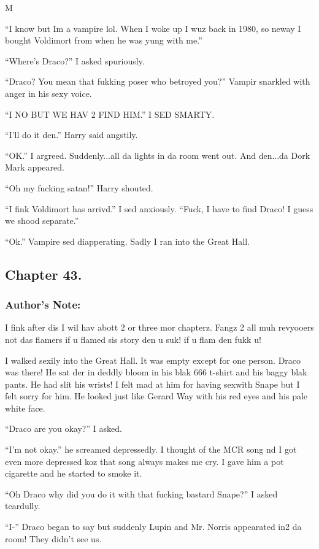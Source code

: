 M\documentclass{article}
\begin{document}
“I know but Im a vampire lol. When I woke up I wuz back in 1980, so neway I bought Voldimort from when he was yung with me.”

“Where’s Draco?” I asked spuriously.

“Draco? You mean that fukking poser who betroyed you?” Vampir snarkled with anger in his sexy voice.

“I NO BUT WE HAV 2 FIND HIM.” I SED SMARTY.

“I’ll do it den.” Harry said angstily.

“OK.” I argreed. Suddenly...all da lights in da room went out. And den...da Dork Mark appeared.

“Oh my fucking satan!” Harry shouted.

“I fink Voldimort has arrivd.” I sed anxiously. “Fuck, I have to find Draco! I guess we shood separate.”

“Ok.” Vampire sed diapperating. Sadly I ran into the Great Hall.

\clearpage\nolinenumbers
\subsection*{Chapter 43.}

\subsubsection*{Author's Note: }I fink after dis I wil hav abott 2 or three mor chapterz. Fangz 2 all muh revyooers not das flamers if u flamed sis story den u suk! if u flam den fukk u!

\textbreak
\linenumbers\resetlinenumber

I walked sexily into the Great Hall. It was empty except for one person. Draco was there! He sat der in deddly bloom in his blak 666 t-shirt and his baggy blak pants. He had slit his wrists! I felt mad at him for having sexwith Snape but I felt sorry for him. He looked just like Gerard Way with his red eyes and his pale white face.

“Draco are you okay?” I asked.

“I’m not okay.” he screamed depressedly. I thought of the MCR song nd I got even more depressed koz that song always makes me cry. I gave him a pot cigarette and he started to smoke it.

“Oh Draco why did you do it with that fucking bastard Snape?” I asked teardully.

“I-” Draco began to say but suddenly Lupin and Mr. Norris appearated in2 da room! They didn’t see us.
\end{document}
